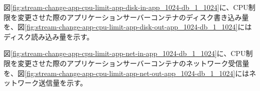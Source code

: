 \documentclass[../../../../main]{subfiles}
\begin{document}
    図\ref{fig:stream-change-app-cpu-limit-app-disk-in-app_1024-db_1_1024}に、CPU制限を変更させた際のアプリケーションサーバーコンテナのディスク書き込み量を、図\ref{fig:stream-change-app-cpu-limit-app-disk-out-app_1024-db_1_1024}にはディスク読み込み量を示す。

    
    


    図\ref{fig:stream-change-app-cpu-limit-app-net-in-app_1024-db_1_1024}に、CPU制限を変更させた際のアプリケーションサーバーコンテナのネットワーク受信量を、図\ref{fig:stream-change-app-cpu-limit-app-net-out-app_1024-db_1_1024}にはネットワーク送信量を示す。

    
    
\end{document}
